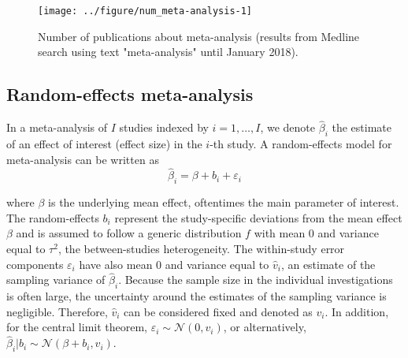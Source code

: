\documentclass[11pt,a4paper,twoside,openany]{book}\usepackage{knitr}
\begin{document}
{{\begin{knitrout}\footnotesize
{}\color{fgcolor}\begin{figure}[ht!]

{\centering \texttt{[image: ../figure/num\_meta-analysis-1]} 

}

\caption[Number of publications about meta-analysis (results from Medline search using text "meta-analysis" until January 2018)]{Number of publications about meta-analysis (results from Medline search using text "meta-analysis" until January 2018).}\label{fig:num_meta-analysis}
\end{figure}


\end{knitrout}

\subsection{Random-effects meta-analysis}
\label{sec:rma}

In a meta-analysis of $I$ studies indexed by $i = 1, \dots, I$, we denote $\hat \beta_i$ the estimate of an effect of interest (effect size) in the $i$-th study.
A random-effects model for meta-analysis can be written as
\begin{equation}
\hat \beta_i = \beta + b_i + \varepsilon_i
\label{eq:rma}
\end{equation}

\noindent where $\beta$ is the underlying mean effect, oftentimes the main parameter of interest. 
The random-effects $b_i$ represent the study-specific deviations from the mean effect $\beta$ and is assumed to follow a generic distribution $f$ with mean 0 and variance equal to $\tau^2$, the between-studies heterogeneity. 
The within-study error components $\varepsilon_i$ have also mean 0 and variance equal to $\hat v_i$, an estimate of the sampling variance of $\hat \beta_i$.
Because the sample size in the individual investigations is often large, the uncertainty around the estimates of the sampling variance is negligible. Therefore, $\hat v_i$ can be considered fixed and denoted as $v_i$. In addition, for the central limit theorem, $\varepsilon_i \sim  \mathcal{N}\left(0, v_i \right)$, or alternatively, $\hat \beta_i | b_i \sim \mathcal{N}\left(\beta+b_i, v_i \right)$.

}}
\end{document}
